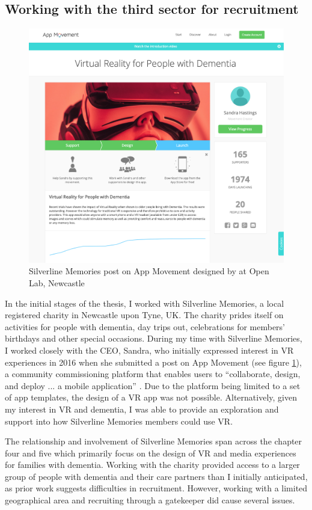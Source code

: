 \subsection{Working with the third sector for recruitment}
\label{Method:ThirdSector}
\begin{figure}[htp]
    \centering
    \includegraphics[width=0.6\linewidth]{Images/Methodology/AppMovement-SilverlineMemories.png}
    \caption{Silverline Memories post on App Movement designed by  \cite{garbett_app_2016} at Open Lab, Newcastle}
    \label{fig:AppMovement-Sandra}
\end{figure}

In the initial stages of the thesis, I worked with Silverline Memories, a local registered charity in Newcastle upon Tyne, UK. The charity prides itself on activities for people with dementia, day trips out, celebrations for members' birthdays and other special occasions. During my time with Silverline Memories, I worked closely with the CEO, Sandra, who initially expressed interest in VR experiences in 2016 when she submitted a post on App Movement (see figure \ref{fig:AppMovement-Sandra}), a community commissioning platform that enables users to ``collaborate, design, and deploy ... a mobile application'' \citep{garbett_app_2016}. Due to the platform being limited to a set of app templates, the design of a VR app was not possible. Alternatively, given my interest in VR and dementia, I was able to provide an exploration and support into how Silverline Memories members could use VR. 

The relationship and involvement of Silverline Memories span across the chapter four and five which primarily focus on the design of VR and media experiences for families with dementia. Working with the charity provided access to a larger group of people with dementia and their care partners than I initially anticipated, as prior work suggests difficulties in recruitment. However, working with a limited geographical area and recruiting through a gatekeeper did cause several issues. 

